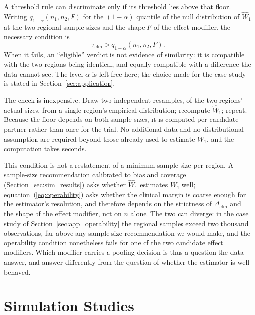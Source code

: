 \documentclass[AMA,Times1COL]{WileyNJDv5}
\begin{document}
A threshold rule can discriminate only if its threshold lies above that floor. Writing $q_{1-\alpha}(n_1, n_2, F)$ for the $(1-\alpha)$ quantile of the null distribution of $\widehat{W}_1$ at the two regional sample sizes and the shape $F$ of the effect modifier, the necessary condition is
\begin{equation}
\tau_{\text{clin}} > q_{1-\alpha}(n_1, n_2, F).
\label{eq:operability}
\end{equation}
When it fails, an ``eligible'' verdict is not evidence of similarity: it is compatible with the two regions being identical, and equally compatible with a difference the data cannot see. The level $\alpha$ is left free here; the choice made for the case study is stated in Section~\ref{sec:application}.

The check is inexpensive. Draw two independent resamples, of the two regions' actual sizes, from a single region's empirical distribution; recompute $\widehat{W}_1$; repeat. Because the floor depends on both sample sizes, it is computed per candidate partner rather than once for the trial. No additional data and no distributional assumption are required beyond those already used to estimate $W_1$, and the computation takes seconds.

This condition is not a restatement of a minimum sample size per region. A sample-size recommendation calibrated to bias and coverage (Section~\ref{sec:sim_results}) asks whether $\widehat{W}_1$ estimates $W_1$ well; equation~(\ref{eq:operability}) asks whether the clinical margin is coarse enough for the estimator's resolution, and therefore depends on the strictness of $\Delta_{\text{clin}}$ and the shape of the effect modifier, not on $n$ alone. The two can diverge: in the case study of Section~\ref{sec:app_operability} the regional samples exceed two thousand observations, far above any sample-size recommendation we would make, and the operability condition nonetheless fails for one of the two candidate effect modifiers. Which modifier carries a pooling decision is thus a question the data answer, and answer differently from the question of whether the estimator is well behaved.

\section{Simulation Studies}\label{sec:simulation}
\end{document}
